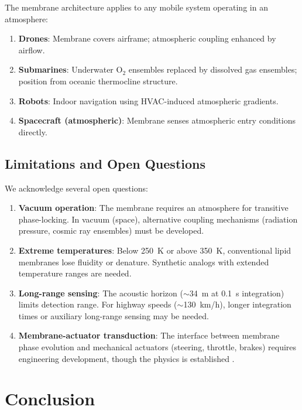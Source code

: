 \documentclass[12pt]{article}
\theoremstyle{definition}
\theoremstyle{remark}
\begin{document}
The membrane architecture applies to any mobile system operating in an atmosphere:

\begin{enumerate}[label=(\roman*)]
  \item \textbf{Drones}: Membrane covers airframe; atmospheric coupling enhanced by airflow.
  \item \textbf{Submarines}: Underwater $\mathrm{O}_2$ ensembles replaced by dissolved gas ensembles; position from oceanic thermocline structure.
  \item \textbf{Robots}: Indoor navigation using HVAC-induced atmospheric gradients.
  \item \textbf{Spacecraft (atmospheric)}: Membrane senses atmospheric entry conditions directly.
\end{enumerate}

\subsection{Limitations and Open Questions}

We acknowledge several open questions:

\begin{enumerate}[label=(\roman*)]
  \item \textbf{Vacuum operation}: The membrane requires an atmosphere for transitive phase-locking. In vacuum (space), alternative coupling mechanisms (radiation pressure, cosmic ray ensembles) must be developed.
  \item \textbf{Extreme temperatures}: Below \SI{250}{K} or above \SI{350}{K}, conventional lipid membranes lose fluidity or denature. Synthetic analogs with extended temperature ranges are needed.
  \item \textbf{Long-range sensing}: The acoustic horizon ($\sim$\SI{34}{m} at \SI{0.1}{s} integration) limits detection range. For highway speeds ($\sim$\SI{130}{km/h}), longer integration times or auxiliary long-range sensing may be needed.
  \item \textbf{Membrane-actuator transduction}: The interface between membrane phase evolution and mechanical actuators (steering, throttle, brakes) requires engineering development, though the physics is established \cite{sachikonye2025circuits}.
\end{enumerate}


\section{Conclusion}
\label{sec:conclusion}
\end{document}
